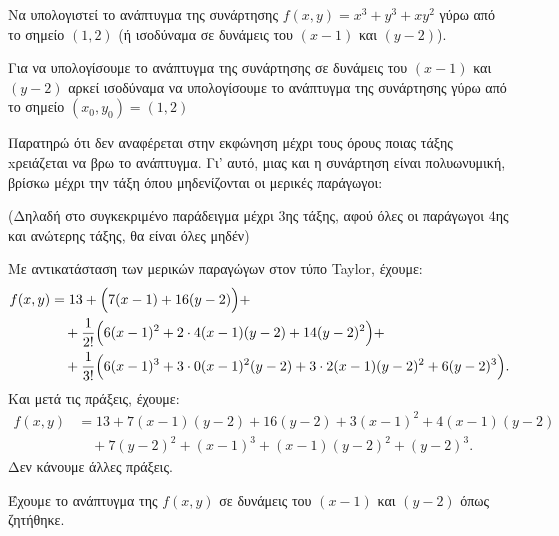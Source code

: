 \begin{example}
  Να υπολογιστεί το ανάπτυγμα της συνάρτησης $f(x,y)=x^3+y^3+xy^2$ γύρω από το 
  σημείο $ (1,2) $ (ή ισοδύναμα σε δυνάμεις του $(x-1)$ και $(y-2)$).
\end{example}
\begin{solution}
  Για να υπολογίσουμε το ανάπτυγμα της συνάρτησης σε δυνάμεις του $(x-1)$ και $(y-2)$ 
  αρκεί ισοδύναμα να υπολογίσουμε το ανάπτυγμα της συνάρτησης γύρω από το 
  σημείο $(x_0,y_0)=(1,2)$

  Παρατηρώ ότι δεν αναφέρεται στην εκφώνηση μέχρι τους όρους ποιας τάξης 
  xρειάζεται να βρω το ανάπτυγμα.  Γι' αυτό, μιας και η συνάρτηση είναι πολυωνυμική,
  βρίσκω μέχρι την τάξη όπου μηδενίζονται οι μερικές παράγωγοι: 

  (Δηλαδή στο συγκεκριμένο παράδειγμα μέχρι $3$ης τάξης, αφού όλες οι παράγωγοι 
  $4$ης και ανώτερης τάξης, θα είναι όλες μηδέν)

  \vspace{\baselineskip}


  \vspace{\baselineskip}

  Με αντικατάσταση των μερικών παραγώγων στον τύπο Taylor, έχουμε:
  \begin{align*}
    f(x,y)&=13+\Bigl(7(x-1)+16(y-2)\Bigr)+ \\ 
          &\quad +\frac{1}{2!}\Bigl(6(x-1)^2 +2\cdot 4(x-1)(y-2)+14(y-2)^2\Bigr)+ \\
          &\quad +\frac{1}{3!}\Bigl(6(x-1)^3+3\cdot 0(x-1)^2(y-2)+3
          \cdot 2(x-1)(y-2)^2+6(y-2)^3\Bigr).
  \end{align*}
  Και μετά τις πράξεις, έχουμε: 
  \begin{align*}
    f(x,y)&=13+7(x-1)(y-2)+16(y-2)+3(x-1)^2+4(x-1)(y-2) \\
          &\quad +7(y-2)^2+(x-1)^3+(x-1)(y-2)^2+(y-2)^3.
  \end{align*}
  Δεν κάνουμε άλλες πράξεις.

  Έχουμε το ανάπτυγμα της $f(x,y)$ σε δυνάμεις του $(x-1)$ και $(y-2)$ όπως ζητήθηκε.
\end{solution}



